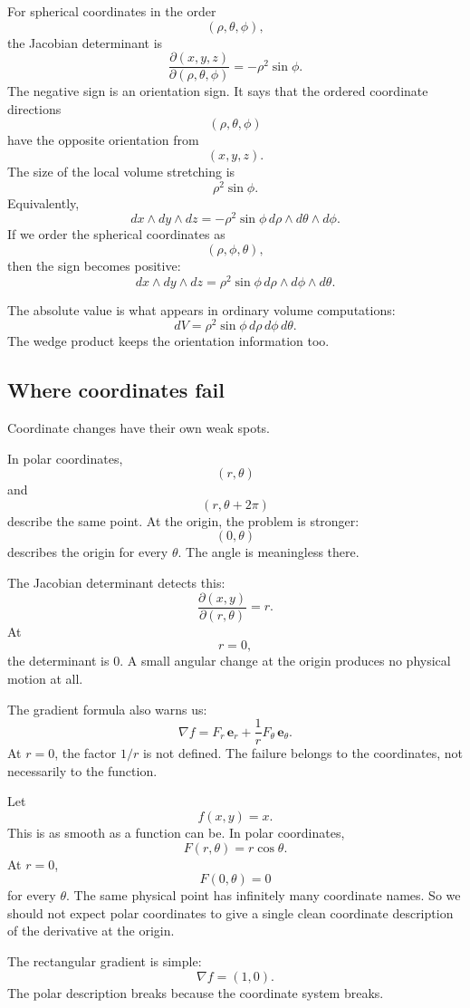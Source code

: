 For spherical coordinates in the order
\[
    (\rho,\theta,\phi),
\]
the Jacobian determinant is
\[
\boxed{
    \frac{\partial(x,y,z)}{\partial(\rho,\theta,\phi)}
    =
    -\rho^2\sin\phi.
}
\]
The negative sign is an orientation sign.  It says that the ordered coordinate directions
\[
    (\rho,\theta,\phi)
\]
have the opposite orientation from
\[
    (x,y,z).
\]
The size of the local volume stretching is
\[
\boxed{
    \rho^2\sin\phi.
}
\]
Equivalently,
\[
\boxed{
    dx\wedge dy\wedge dz
    =
    -\rho^2\sin\phi\,
    d\rho\wedge d\theta\wedge d\phi.
}
\]
If we order the spherical coordinates as
\[
    (\rho,\phi,\theta),
\]
then the sign becomes positive:
\[
\boxed{
    dx\wedge dy\wedge dz
    =
    \rho^2\sin\phi\,
    d\rho\wedge d\phi\wedge d\theta.
}
\]

The absolute value is what appears in ordinary volume computations:
\[
    dV=\rho^2\sin\phi\,d\rho\,d\phi\,d\theta.
\]
The wedge product keeps the orientation information too.

\subsection{Where coordinates fail}

Coordinate changes have their own weak spots.

In polar coordinates,
\[
    (r,\theta)
\]
and
\[
    (r,\theta+2\pi)
\]
describe the same point.  At the origin, the problem is stronger:
\[
    (0,\theta)
\]
describes the origin for every \(\theta\).  The angle is meaningless there.

The Jacobian determinant detects this:
\[
    \frac{\partial(x,y)}{\partial(r,\theta)}=r.
\]
At
\[
    r=0,
\]
the determinant is \(0\).  A small angular change at the origin produces no physical
motion at all.

The gradient formula also warns us:
\[
    \nabla f
    =
    F_r\,\mathbf e_r+\frac1rF_\theta\,\mathbf e_\theta.
\]
At \(r=0\), the factor \(1/r\) is not defined.  The failure belongs to the coordinates,
not necessarily to the function.

\begin{example}
Let
\[
    f(x,y)=x.
\]
This is as smooth as a function can be.  In polar coordinates,
\[
    F(r,\theta)=r\cos\theta.
\]
At \(r=0\),
\[
    F(0,\theta)=0
\]
for every \(\theta\).  The same physical point has infinitely many coordinate names.
So we should not expect polar coordinates to give a single clean coordinate description
of the derivative at the origin.

The rectangular gradient is simple:
\[
    \nabla f=(1,0).
\]
The polar description breaks because the coordinate system breaks.
\end{example}


